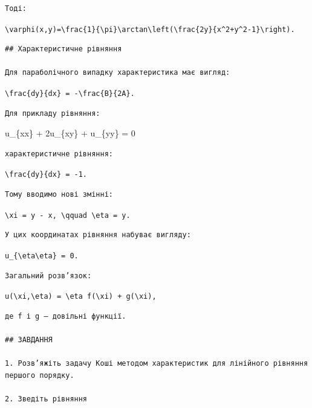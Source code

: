 \documentclass[
  ukrainian,
]{article}
\begin{document}
\begin{verbatim}
Тоді:
\end{verbatim}

\texttt{\textbackslash{}varphi(x,y)=\textbackslash{}frac\{1\}\{\textbackslash{}pi\}\textbackslash{}arctan\textbackslash{}left(\textbackslash{}frac\{2y\}\{x\^{}2+y\^{}2-1\}\textbackslash{}right).}

\begin{verbatim}
## Характеристичне рівняння

Для параболічного випадку характеристика має вигляд:
\end{verbatim}

\texttt{\textbackslash{}frac\{dy\}\{dx\}\ =\ -\textbackslash{}frac\{B\}\{2A\}.}

\begin{verbatim}
Для прикладу рівняння:
\end{verbatim}

u\_\{xx\} + 2u\_\{xy\} + u\_\{yy\} = 0

\begin{verbatim}
характеристичне рівняння:
\end{verbatim}

\texttt{\textbackslash{}frac\{dy\}\{dx\}\ =\ -1.}

\begin{verbatim}
Тому вводимо нові змінні:
\end{verbatim}

\texttt{\textbackslash{}xi\ =\ y\ -\ x,\ \textbackslash{}qquad\ \textbackslash{}eta\ =\ y.}

\begin{verbatim}
У цих координатах рівняння набуває вигляду:
\end{verbatim}

\texttt{u\_\{\textbackslash{}eta\textbackslash{}eta\}\ =\ 0.}

\begin{verbatim}
Загальний розв’язок:
\end{verbatim}

\texttt{u(\textbackslash{}xi,\textbackslash{}eta)\ =\ \textbackslash{}eta\ f(\textbackslash{}xi)\ +\ g(\textbackslash{}xi),}

\begin{verbatim}
де f і g — довільні функції.

## ЗАВДАННЯ

1. Розв’яжіть задачу Коші методом характеристик для лінійного рівняння першого порядку.

2. Зведіть рівняння
\end{verbatim}
\end{document}
